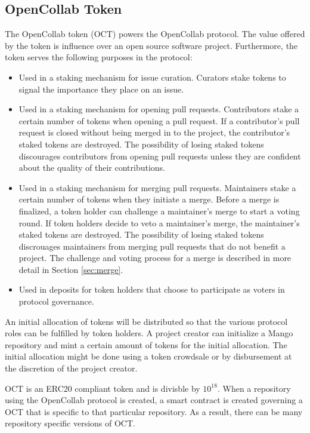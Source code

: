 \subsection{OpenCollab Token}

The OpenCollab token (OCT) powers the OpenCollab protocol. The value offered by
the token is influence over an open source software project. Furthermore, the
token serves the following purposes in the protocol:

\begin{itemize}
  \item Used in a staking mechanism for issue curation. Curators stake tokens to
    signal the importance they place on an issue.
  \item Used in a staking mechanism for opening pull requests. Contributors
    stake a certain number of tokens when opening a pull request. If a
    contributor's pull request is closed without being merged in to the project,
    the contributor's staked tokens are destroyed. The possibility of losing
    staked tokens discourages contributors from opening pull requests unless
    they are confident about the quality of their contributions.
  \item Used in a staking mechanism for merging pull requests. Maintainers stake
    a certain number of tokens when they initiate a merge. Before a merge is
    finalized, a token holder can challenge a maintainer's merge to start a
    voting round. If token holders decide to veto a maintainer's merge, the
    maintainer's staked tokens are destroyed. The possibility of losing staked
    tokens discrouages maintainers from merging pull requests that do not
    benefit a project. The challenge and voting process for a merge is described
    in more detail in Section \ref{sec:merge}.
  \item Used in deposits for token holders that choose to participate as voters
    in protocol governance.
\end{itemize}

An initial allocation of tokens will be distributed so that the various protocol
roles can be fulfilled by token holders. A project creator can initialize a Mango repository and mint a certain amount of
tokens for the initial allocation. The initial allocation might be done using a
token crowdsale or by disbursement at the discretion of the project creator.

OCT is an ERC20 compliant token\cite{erc20} and is divisble by $10^{18}$. When a
repository using the OpenCollab protocol is created, a smart contract is created
governing a OCT that is specific to that particular repository. As a result,
there can be many repository specific versions of OCT.

